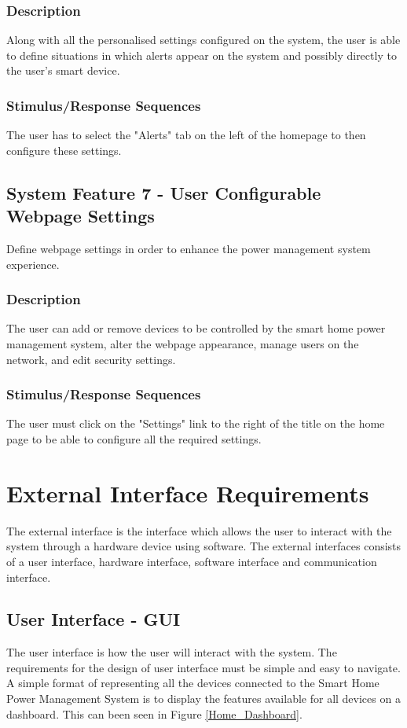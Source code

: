 \documentclass[11pt, a4paper]{article}
\begin{document}
	\subsubsection{Description}
	Along with all the personalised settings configured on the system, the user is able to define situations in which alerts appear on the system and possibly directly to the user's smart device. 
	\subsubsection{Stimulus/Response Sequences}
	The user has to select the "Alerts" tab on the left of the homepage to then configure these settings.
	\subsection{System Feature 7 - User Configurable Webpage Settings} 
	Define webpage settings in order to enhance the power management system experience.
	\subsubsection{Description}
	The user can add or remove devices to be controlled by the smart home power management system, alter the webpage appearance, manage users on the network, and edit security settings. 
	\subsubsection{Stimulus/Response Sequences}
	The user must click on the "Settings" link to the right of the title on the home page to be able to configure all the required settings.
	
	\section{External Interface Requirements}
	The external interface is the interface which allows the user to interact with the system through a hardware device using software. The external interfaces consists of a user interface, hardware interface, software interface and communication interface. 
	
	\subsection{User Interface - GUI}
	The user interface is how the user will interact with the system. The requirements for the design of user interface must be simple and easy to navigate. A simple format of representing all the devices connected to the Smart Home Power Management System is to display the features available for all devices on a dashboard. This can been seen in Figure \ref{Home_Dashboard}.
	
\end{document}

